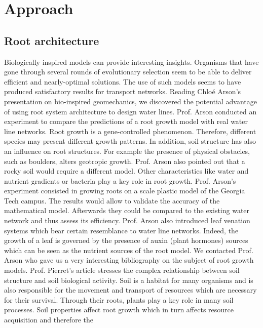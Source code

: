 ﻿
\chapter{Approach}
\label{capitolo3}
\thispagestyle{empty}


\section{Root architecture}



\parindent Biologically inspired models can provide interesting insights. Organisms that have gone
through several rounds of evolutionary selection seem to be able to deliver efficient and
nearly-optimal solutions. The use of such models seems to have produced satisfactory
results for transport networks.
\bigbreak
Reading Chloé Arson’s presentation on bio-inspired geomechanics, we discovered the
potential advantage of using root system architecture to design water lines. Prof. Arson
conducted an experiment to compare the predictions of a root growth model with real
water line networks. Root growth is a gene-controlled phenomenon. Therefore, different
species may present different growth patterns. In addition, soil structure has also an influence
on root structures. For example the presence of physical obstacles, such as boulders,
alters geotropic growth. Prof. Arson also pointed out that a rocky soil would require a different model. Other characteristics like water and nutrient gradients or bacteria play
a key role in root growth. Prof. Arson’s experiment consisted in growing roots on a
scale plastic model of the Georgia Tech campus. The results would allow to validate the
accuracy of the mathematical model. Afterwards they could be compared to the existing
water network and thus assess its efficiency. Prof. Arson also introduced leaf venation
systems which bear certain resemblance to water line networks. Indeed, the growth of a
leaf is governed by the presence of auxin (plant hormones) sources which can be seen as
the nutrient sources of the root model.
\bigbreak 
We contacted Prof. Arson who gave us a very interesting bibliography on the subject
of root growth models. Prof. Pierret’s article stresses the complex relationship between
soil structure and soil biological activity. Soil is a habitat for many organisms and is
also responsible for the movement and transport of resources which are necessary for
their survival. Through their roots, plants play a key role in many soil processes. Soil
properties affect root growth which in turn affects resource acquisition and therefore the
